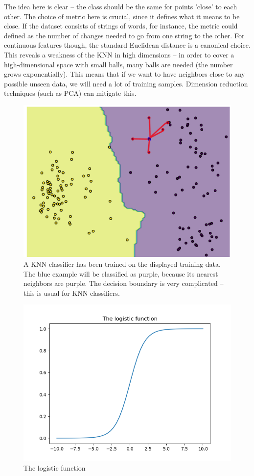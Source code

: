 \documentclass{article}
\begin{document}
The idea here is clear -- the class should be the same for points 'close' to each other. The choice of metric here is crucial, since it defines what it means to be close. If the dataset consists of strings of words, for instance, the metric could defined as the number of changes needed to go from one string to the other. For continuous features though, the standard Euclidean distance is a canonical choice. This reveals a weakness of the KNN in high dimensions -- in order to cover a high-dimensional space with small balls, many balls are needed (the number grows exponentially). This means that if we want to have neighbors close to any possible unseen data, we will need a lot of training samples. Dimension reduction techniques (such as PCA) can mitigate this.

\begin{figure}
    \centering
    \includegraphics[width=0.5\linewidth]{graphics/knn_classification.png}
    \caption{A KNN-classifier has been trained on the displayed training data. The blue example will be classified as purple, because its nearest neighbors are purple. The decision boundary is very complicated -- this is usual for KNN-classifiers.}
\end{figure}

\begin{figure}
    \centering
    \includegraphics[width=0.5\linewidth]{graphics/logistic.png}
    \caption{The logistic function}
\end{figure}
\end{document}
